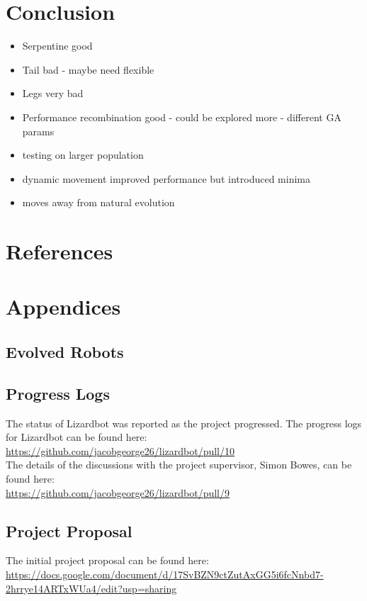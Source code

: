 \documentclass{article}
\begin{document}
\newpage
\section{Conclusion}
\label{sec:Conclusion}
\begin{itemize}
\item Serpentine good
\item Tail bad - maybe need flexible
\item Legs very bad
\item Performance recombination good - could be explored more - different GA params
\item testing on larger population
\item dynamic movement improved performance but introduced minima
\item moves away from natural evolution

\end{itemize}
\newpage

\section{References}
\label{sec:References}

\newpage


\section{Appendices}
\subsection{Evolved Robots}
\label{sec:Final Robots}
\subsection{Progress Logs}
The status of Lizardbot was reported as the project progressed.
The progress logs for Lizardbot can be found here:\\
\url{https://github.com/jacobgeorge26/lizardbot/pull/10}\\

\noindent The details of the discussions with the project supervisor, Simon Bowes, can be found here:\\
\url{https://github.com/jacobgeorge26/lizardbot/pull/9}


\subsection{Project Proposal}
The initial project proposal can be found here:\\
\url{https://docs.google.com/document/d/17SvBZN9ctZutAxGG5i6fcNnbd7-2hrrye14ARTxWUa4/edit?usp=sharing}
\end{document}
